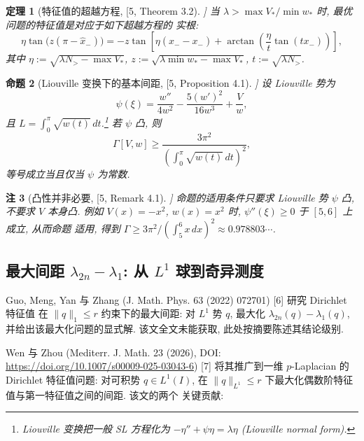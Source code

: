 \documentclass[UTF8]{ctexart}
\newtheorem{theorem}{定理}[section]
\newtheorem{proposition}[theorem]{命题}
\newtheorem{remark}[theorem]{注}
\begin{document}
\begin{theorem}[特征值的超越方程, [5, Theorem 3.2]]
当 $\lambda > \max V_* / \min w_*$ 时, 最优问题的特征值是对应于如下超越方程的
实根:
\begin{equation}
	\eta \tan\bigl(z(\pi - \hat{x}_-)\bigr)
		= -z \tan\left[ \eta(\hat{x}_- - x_-) + \arctan\left( \frac{\eta}{t} \tan(t x_-) \right) \right],
\end{equation}
其中 $\eta := \sqrt{\lambda N_> - \max V_*}$, $z := \sqrt{\lambda \min w_* - \max V_*}$,
$t := \sqrt{\lambda N_>}$.
\end{theorem}

\begin{proposition}[Liouville 变换下的基本间距, [5, Proposition 4.1]]
设 Liouville 势为
\begin{equation}
	\psi(\xi) = \frac{w''}{4w^2} - \frac{5(w')^2}{16w^3} + \frac{V}{w},
\end{equation}
且 $L = \int_0^{\pi} \sqrt{w(t)} \, dt$.\footnote{Liouville 变换把一般 SL 方程化为 $-\eta'' + \psi\eta = \lambda\eta$ (Liouville normal form).} 若 $\psi$ 凸, 则
\begin{equation}
	\Gamma[V, w] \geq \frac{3\pi^2}{\left( \int_0^{\pi} \sqrt{w(t)} \, dt \right)^2},
\end{equation}
等号成立当且仅当 $\psi$ 为常数.
\end{proposition}

\begin{remark}[凸性并非必要, [5, Remark 4.1]]
命题的适用条件只要求 Liouville 势 $\psi$ 凸, 不要求 $V$ 本身凸. 例如
$V(x) = -x^2$, $w(x) = x^2$ 时, $\psi''(\xi) \geq 0$ 于 $[5, 6]$ 上成立, 从而命题
适用, 得到 $\Gamma \geq 3\pi^2 / (\int_5^6 x \, dx)^2 \approx 0.978803\cdots$.
\end{remark}

\subsection{\texorpdfstring{最大间距 $\lambda_{2n} - \lambda_1$: 从 $L^1$ 球到奇异测度}{最大间距 lambda2n - lambda1: 从 L1 球到奇异测度}}

Guo, Meng, Yan 与 Zhang (J. Math. Phys. 63 (2022) 072701) [6] 研究 Dirichlet 特征值
在 $\|q\|_1 \leq r$ 约束下的最大间距: 对 $L^1$ 势 $q$, 最大化
$\lambda_{2n}(q) - \lambda_1(q)$, 并给出该最大化问题的显式解. 该文全文未能获取,
此处按摘要陈述其结论级别.

Wen 与 Zhou (Mediterr. J. Math. 23 (2026), DOI: \url{https://doi.org/10.1007/s00009-025-03043-6}) [7]
将其推广到一维 $p$-Laplacian 的 Dirichlet 特征值问题: 对可积势 $q \in L^1(I)$,
在 $\|q\|_{L^1} \leq r$ 下最大化偶数阶特征值与第一特征值之间的间距. 该文的两个
关键贡献:
\end{document}
